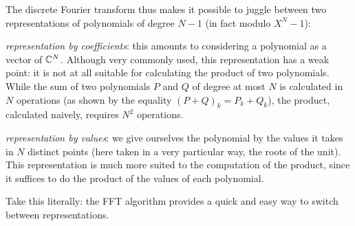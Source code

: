  
The discrete Fourier transform thus makes it possible to juggle between two representations of polynomials of degree $ N-1 $ (in fact modulo $ X^N-1 $): \begin{rs}
\item {} \textit{representation by coefficients}: this amounts to considering a polynomial as a vector of $ \mathbb{C}^N $. Although very commonly used, this representation has a weak point: it is not at all suitable for calculating the product of two polynomials. While the sum of two polynomials $ P $ and $ Q $ of degree at most $ N $ is calculated in $ N $ operations (as shown by the equality $ (P + Q)_k = P_k + Q_k $), the product, calculated naively, requires $ N^2 $ operations.
\item {} \textit{representation by values}: we give ourselves the polynomial by the values it takes in $ N $ distinct points (here taken in a very particular way, the roots  of the unit). This representation is much more suited to the computation of the product, since it suffices to do the product of the values of each polynomial.
\end{rs} Take this literally: the FFT algorithm provides a quick and easy way to switch between representations.
 
